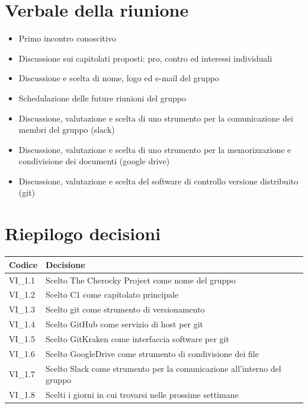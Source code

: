 \documentclass{article}
\begin{document}
	\section{Verbale della riunione}
	\begin{itemize}
	    \item Primo incontro conoscitivo
	    \item Discussione sui capitolati proposti: pro, contro ed interessi individuali
	    \item Discussione e scelta di nome, logo ed e-mail del gruppo
	    \item Schedulazione delle future riunioni del gruppo
	    \item Discussione, valutazione e scelta di uno strumento per la comunicazione dei membri del gruppo (slack)
        \item Discussione, valutazione e scelta di uno strumento per la memorizzazione e condivisione dei documenti (google drive)
        \item Discussione, valutazione e scelta del software di controllo versione distribuito (git)
	\end{itemize}
    \section{Riepilogo decisioni}
    \setlength{\tabcolsep}{18pt}
    \renewcommand{\arraystretch}{1.5}
    { \normalsize\mdseries
    \begin{tabular}{ |p{} p{}| } 
        \hline
        \rowcolor{custom}
        \bfseries\leavevmode\color{white} Codice & \bfseries\leavevmode\color{white} Decisione \\
        \hline\hline
        VI\_1.1 & Scelto The Cherocky Project come nome del gruppo \\
        VI\_1.2 & Scelto C1 come capitolato principale \\
        VI\_1.3 & Scelto git come strumento di versionamento \\
        VI\_1.4 & Scelto GitHub come servizio di host per git \\
        VI\_1.5 & Scelto GitKraken come interfaccia software per git \\
        VI\_1.6 & Scelto GoogleDrive come strumento di condivisione dei file \\
        VI\_1.7 & Scelto Slack come strumento per la comunicazione all'interno del gruppo \\
        VI\_1.8 & Scelti i giorni in cui trovarsi nelle prossime settimane \\
        \hline
    \end{tabular}
    }
\end{document}
